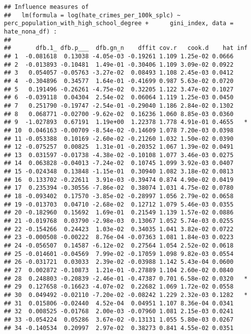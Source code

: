 \documentclass[
]{article}
\begin{document}
\begin{verbatim}
## Influence measures of
##   lm(formula = log(hate_crimes_per_100k_splc) ~ perc_population_with_high_school_degree +      gini_index, data = hate_nona_df) :
## 
##       dfb.1_ dfb.p___  dfb.gn_n    dffit cov.r   cook.d    hat inf
## 1  -0.081618  0.13038 -4.05e-03 -0.19261 1.109 1.25e-02 0.0666    
## 2  -0.013893 -0.10481  1.49e-01 -0.30406 1.109 3.09e-02 0.0922    
## 3   0.054057 -0.05763 -3.27e-02  0.08493 1.108 2.45e-03 0.0412    
## 4  -0.304896  0.34577  1.64e-01 -0.41699 0.987 5.63e-02 0.0720    
## 5   0.191496 -0.26261 -4.75e-02  0.32205 1.122 3.47e-02 0.1027    
## 6  -0.039118  0.04304  2.54e-02  0.06064 1.119 1.25e-03 0.0450    
## 7   0.251790 -0.19747 -2.54e-01 -0.29040 1.186 2.84e-02 0.1302    
## 8   0.068771 -0.02700 -9.62e-02  0.16236 1.060 8.85e-03 0.0360    
## 9  -1.027893  0.67191  1.19e+00  1.22378 1.778 4.91e-01 0.4655   *
## 10  0.046163 -0.00709 -8.54e-02 -0.14609 1.078 7.20e-03 0.0398    
## 11 -0.053388  0.10169 -2.60e-02 -0.21260 1.032 1.50e-02 0.0390    
## 12 -0.075257  0.00825  1.31e-01 -0.20352 1.067 1.39e-02 0.0491    
## 13  0.031597 -0.01738 -4.38e-02 -0.10108 1.077 3.46e-03 0.0275    
## 14  0.063828 -0.04013 -7.24e-02  0.10745 1.099 3.92e-03 0.0407    
## 15 -0.024348  0.13848 -1.15e-01  0.30940 1.082 3.18e-02 0.0813    
## 16  0.133702 -0.22611  3.91e-03 -0.39474 0.874 4.90e-02 0.0419    
## 17  0.235394 -0.30556 -7.86e-02  0.38074 1.031 4.75e-02 0.0780    
## 18 -0.093402  0.17570 -3.85e-02 -0.28997 1.056 2.79e-02 0.0658    
## 19 -0.013703  0.04710 -2.68e-02  0.12712 1.079 5.46e-03 0.0355    
## 20 -0.182960  0.15692  1.69e-01  0.21549 1.139 1.57e-02 0.0886    
## 21 -0.019768  0.03790 -2.98e-03  0.13067 1.052 5.74e-03 0.0255    
## 22 -0.154266  0.24423  1.03e-02  0.34035 1.041 3.82e-02 0.0722    
## 23 -0.000508 -0.00222  8.76e-04 -0.07363 1.081 1.84e-03 0.0223    
## 24 -0.056507  0.14587 -6.12e-02  0.27564 1.054 2.52e-02 0.0618    
## 25 -0.014601 -0.04569  7.99e-02 -0.17059 1.098 9.82e-03 0.0554    
## 26 -0.031721  0.03033  2.39e-02 -0.03988 1.142 5.43e-04 0.0600    
## 27  0.002872 -0.10873  1.21e-01 -0.27889 1.104 2.60e-02 0.0840    
## 28  0.248803 -0.20839 -2.46e-01 -0.47387 0.701 6.58e-02 0.0320   *
## 29  0.127658 -0.16623 -4.07e-02  0.22682 1.069 1.72e-02 0.0558    
## 30  0.049492 -0.02110 -7.20e-02 -0.08242 1.229 2.32e-03 0.1282   *
## 31  0.015806 -0.02440  4.52e-04  0.04951 1.107 8.36e-04 0.0341    
## 32  0.008525 -0.01768  2.00e-03 -0.07960 1.081 2.15e-03 0.0241    
## 33 -0.054224  0.05286  3.67e-02 -0.13131 1.055 5.80e-03 0.0267    
## 34 -0.140534  0.20997  2.97e-02  0.38273 0.841 4.55e-02 0.0351    

\end{verbatim}
\end{document}

